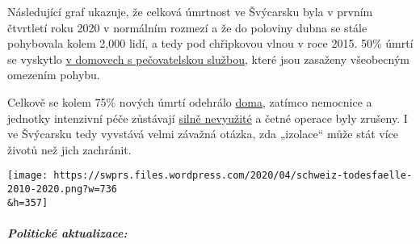 Následující graf ukazuje, že celková úmrtnost ve Švýcarsku byla v prvním
čtvrtletí roku 2020 v normálním rozmezí a že do poloviny dubna se stále
pohybovala kolem 2,000 lidí, a tedy pod chřipkovou vlnou v roce 2015.
50\% úmrtí se vyskytlo
\href{https://www.nzz.ch/zuerich/coronavirus-zuerich-aendert-nun-das-testregime-in-heimenauch-viele-aeltere-covid-19-infizierte-entwickeln-keine-symptome-zuerich-aendert-nun-das-testregime-in-heimen-ld.1552089}{v
domovech s pečovatelskou službou}, které jsou zasaženy všeobecným
omezením pohybu.

 Celkově se kolem 75\% nových úmrtí odehrálo
\href{https://www.tagesspiegel.de/wissen/woran-sterben-corona-patienten-wirklich-ein-schweizer-forscher-macht-hoffnung-im-kampf-gegen-covid-19/25750666.html}{doma},
zatímco nemocnice a jednotky intenzivní péče zůstávají
\href{https://swprs.files.wordpress.com/2020/04/intensivbettenbelegung-schweiz-2020-04-14.png}{silně
nevyužité} a četné operace byly zrušeny. I ve Švýcarsku tedy vyvstává
velmi závažná otázka, zda „izolace`` může stát více životů než jich
zachránit.

\texttt{[image: https://swprs.files.wordpress.com/2020/04/schweiz-todesfaelle-2010-2020.png?w=736\\\&h=357]}

\hypertarget{politickuxe9-aktualizace}{%
\subparagraph{\texorpdfstring{\textbf{Politické
aktualizace:}}{Politické aktualizace:}}\label{politickuxe9-aktualizace}}

